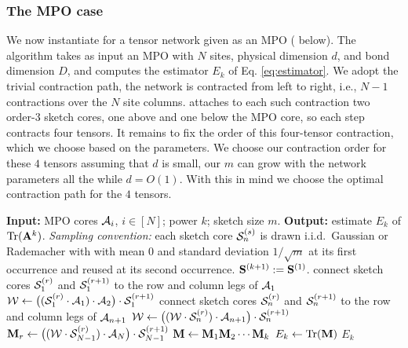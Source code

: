 \documentclass[11pt]{article}
\theoremstyle{plain}
\theoremstyle{definition}
\theoremstyle{remark}
\begin{document}
\subsubsection{The MPO case}
We now instantiate  for a tensor network given as an MPO
( below). The algorithm takes as input an MPO with $N$ sites, physical dimension $d$, and bond
dimension $D$, and computes the estimator $E_k$ of Eq. \eqref{eq:estimator}.
We adopt the trivial contraction path, the network is contracted from left
to right, i.e., $N-1$ contractions over the $N$ site columns.
 attaches to each such contraction two order-$3$ sketch
cores, one above and one below the MPO core, so each step contracts
four tensors.
It remains to fix the order of this four-tensor contraction, which we choose based on the parameters.
We choose our contraction order for these $4$  tensors assuming that $d$  is small, our $m$  can grow with the network parameters all the while $d=O(1)$.  With this in mind we choose the optimal contraction path for the $4$  tensors. 


\begin{algorithm}[H]
\caption{Sketched estimation of $\trace(\matA^{k})$ (MPO)}
\label{alg:mpop}
\begin{algorithmic}[1]
\STATE \textbf{Input:} MPO cores $\mathcal{A}_i$, $i\in[N]$; power $k$; sketch size $m$.
\STATE \textbf{Output:} estimate $E_k$ of $\trace(\matA^{k})$.
\STATE \emph{Sampling convention:} each sketch core $\mathcal{S}_n^{(s)}$ is drawn i.i.d.\ Gaussian or Rademacher with with mean $0$ and standard deviation $1/\sqrt{m}$ at its first occurrence and reused at its second occurrence. $\mathbf{S}^{(k+1)}:=\mathbf{S}^{(1)}$.
  \STATE connect sketch cores $\mathcal{S}_1^{(r)}$ and $\mathcal{S}_1^{(r+1)}$ to the row and column legs of $\mathcal{A}_1$
 \STATE $\mathcal{W}\gets\bigl((\mathcal{S}_1^{(r)}\cdot\mathcal{A}_1)\cdot\mathcal{A}_2\bigr)\cdot\mathcal{S}_1^{(r+1)}$
    \STATE connect sketch cores $\mathcal{S}_n^{(r)}$ and $\mathcal{S}_n^{(r+1)}$ to the row and column legs of $\mathcal{A}_{n+1}$
    \STATE $\mathcal{W}\gets\bigl((\mathcal{W}\cdot\mathcal{S}_n^{(r)})\cdot\mathcal{A}_{n+1}\bigr)\cdot\mathcal{S}_n^{(r+1)}$
  \ENDFOR
  \STATE $\mathbf{M}_r\gets\bigl((\mathcal{W}\cdot\mathcal{S}_{N-1}^{(r)})\cdot\mathcal{A}_N\bigr)\cdot\mathcal{S}_{N-1}^{(r+1)}$
\ENDFOR
\STATE $\mathbf{M}\gets\mathbf{M}_1\mathbf{M}_2\cdots\mathbf{M}_k$
\STATE $E_k\gets\mathop{\mathrm{Tr}}(\mathbf{M})$
\RETURN $E_k$
\end{algorithmic}
\end{algorithm}
\end{document}
